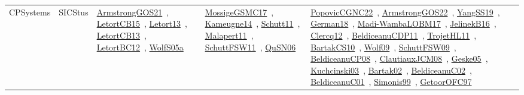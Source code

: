 {\begin{longtable}{lp{3cm}>{\raggedright\arraybackslash}p{6cm}>{\raggedright\arraybackslash}p{6cm}>{\raggedright\arraybackslash}p{8cm}}
CPSystems & SICStus & \href{../works/ArmstrongGOS21.pdf}{ArmstrongGOS21}~\cite{ArmstrongGOS21}, \href{../works/LetortCB15.pdf}{LetortCB15}~\cite{LetortCB15}, \href{../works/Letort13.pdf}{Letort13}~\cite{Letort13}, \href{../works/LetortCB13.pdf}{LetortCB13}~\cite{LetortCB13}, \href{../works/LetortBC12.pdf}{LetortBC12}~\cite{LetortBC12}, \href{../works/WolfS05a.pdf}{WolfS05a}~\cite{WolfS05a} & \href{../works/MossigeGSMC17.pdf}{MossigeGSMC17}~\cite{MossigeGSMC17}, \href{../works/Kameugne14.pdf}{Kameugne14}~\cite{Kameugne14}, \href{../works/Schutt11.pdf}{Schutt11}~\cite{Schutt11}, \href{../works/Malapert11.pdf}{Malapert11}~\cite{Malapert11}, \href{../works/SchuttFSW11.pdf}{SchuttFSW11}~\cite{SchuttFSW11}, \href{../works/QuSN06.pdf}{QuSN06}~\cite{QuSN06} & \href{../works/PopovicCGNC22.pdf}{PopovicCGNC22}~\cite{PopovicCGNC22}, \href{../works/ArmstrongGOS22.pdf}{ArmstrongGOS22}~\cite{ArmstrongGOS22}, \href{../works/YangSS19.pdf}{YangSS19}~\cite{YangSS19}, \href{../works/German18.pdf}{German18}~\cite{German18}, \href{../works/Madi-WambaLOBM17.pdf}{Madi-WambaLOBM17}~\cite{Madi-WambaLOBM17}, \href{../works/JelinekB16.pdf}{JelinekB16}~\cite{JelinekB16}, \href{../works/Clercq12.pdf}{Clercq12}~\cite{Clercq12}, \href{../works/BeldiceanuCDP11.pdf}{BeldiceanuCDP11}~\cite{BeldiceanuCDP11}, \href{../works/TrojetHL11.pdf}{TrojetHL11}~\cite{TrojetHL11}, \href{../works/BartakCS10.pdf}{BartakCS10}~\cite{BartakCS10}, \href{../works/Wolf09.pdf}{Wolf09}~\cite{Wolf09}, \href{../works/SchuttFSW09.pdf}{SchuttFSW09}~\cite{SchuttFSW09}, \href{../works/BeldiceanuCP08.pdf}{BeldiceanuCP08}~\cite{BeldiceanuCP08}, \href{../works/ClautiauxJCM08.pdf}{ClautiauxJCM08}~\cite{ClautiauxJCM08}, \href{../works/Geske05.pdf}{Geske05}~\cite{Geske05}, \href{../works/Kuchcinski03.pdf}{Kuchcinski03}~\cite{Kuchcinski03}, \href{../works/Bartak02.pdf}{Bartak02}~\cite{Bartak02}, \href{../works/BeldiceanuC02.pdf}{BeldiceanuC02}~\cite{BeldiceanuC02}, \href{../works/BeldiceanuC01.pdf}{BeldiceanuC01}~\cite{BeldiceanuC01}, \href{../works/Simonis99.pdf}{Simonis99}~\cite{Simonis99}, \href{../works/GetoorOFC97.pdf}{GetoorOFC97}~\cite{GetoorOFC97}\\

\end{longtable}}
